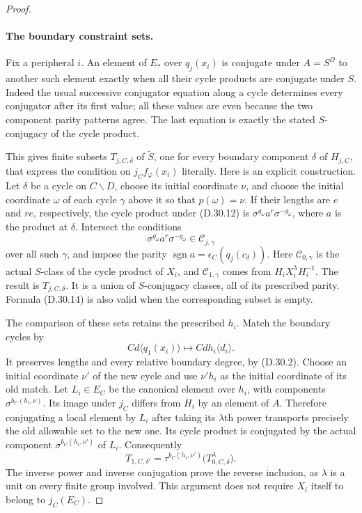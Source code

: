 \begin{proof}
\paragraph{The boundary constraint sets.}
Fix a peripheral $i$.  An element of $E_*$ over
$q_j(x_i)$ is conjugate under $A=S^{\Omega}$ to
another such element exactly when all their cycle
products are conjugate under $S$.  Indeed the
usual successive conjugator equation along a cycle
determines every conjugator after its first value;
all these values are even because the two component
parity patterns agree.  The last equation is exactly
the stated $S$-conjugacy of the cycle product.

This gives finite subsets $T_{j,C,\delta}$ of
$\widetilde S$, one for every boundary component
$\delta$ of $H_{j,C}$, that express the condition
on $j_Cf_\varphi(x_i)$ literally.  Here is an
explicit construction.  Let $\delta$ be a cycle
on $C\backslash D$, choose its initial coordinate
$\nu$, and choose the initial coordinate $\omega$
of each cycle $\gamma$ above it so that
$p(\omega)=\nu$.  If their lengths are $e$ and
$re$, respectively, the cycle product under
\textup{(D.30.12)} is
$\sigma^{g_\omega}a^r\sigma^{-g_\omega}$, where
$a$ is the product at $\delta$.  Intersect the
conditions
\[
 \sigma^{g_\omega}a^r\sigma^{-g_\omega}
       \in\mathcal C_{j,\gamma}
 \tag{D.30.14}
\]
over all such $\gamma$, and impose the parity
$\operatorname{sgn}a=\epsilon_C(q_j(c_\delta))$.
Here $\mathcal C_{0,\gamma}$ is the actual
$S$-class of the cycle product of $X_i$, and
$\mathcal C_{1,\gamma}$ comes from
$H_iX_i^\lambda H_i^{-1}$.
The result is $T_{j,C,\delta}$.  It is a union
of $S$-conjugacy classes, all of its prescribed
parity.  Formula \textup{(D.30.14)} is also valid
when the corresponding subset is empty.

The comparison of these sets retains the prescribed
$h_i$.  Match the boundary cycles by
\[
 C d\langle q_1(x_i)\rangle
       \longmapsto C d h_i\langle d_i\rangle.
 \tag{D.30.15}
\]
It preserves lengths and every relative boundary
degree, by \textup{(D.30.2)}.  Choose an initial
coordinate $\nu'$ of the new cycle and use
$\nu' h_i$ as the initial coordinate of its old
match.  Let $L_i\in E_C$ be the canonical element
over $h_i$, with components
$\sigma^{b_C(h_i,\nu)}$.
Its image under $j_C$ differs from $H_i$ by an
element of $A$.  Therefore conjugating a local
element by $L_i$ after taking its $\lambda$th
power transports precisely the old allowable
set to the new one.  Its cycle product is
conjugated by the actual component
$\sigma^{b_C(h_i,\nu')}$ of $L_i$.  Consequently
\[
 T_{1,C,\delta'}=
       \tau^{b_C(h_i,\nu')}
          \bigl(T_{0,C,\delta}^{\lambda}\bigr).
 \tag{D.30.16}
\]
The inverse power and inverse conjugation prove
the reverse inclusion, as $\lambda$ is a unit
on every finite group involved.  This argument
does not require $X_i$ itself to belong to
$j_C(E_C)$.


\end{proof}
